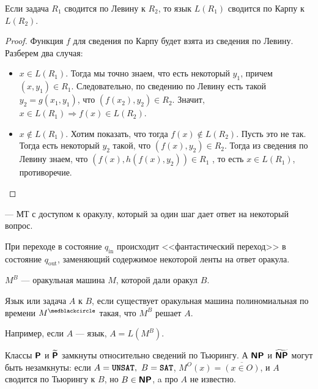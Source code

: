 		\begin{st}
	    Если задача $ R_1$ сводится по Левину к $ R_2$, то язык $ L(R_1)$ сводится по Карпу к $ L(R_2)$.
        \end{st}
        \begin{proof}
	    Функция $ f$ для сведения по Карпу будет взята из сведения по Левину. Разберем два случая:
	    \begin{itemize}
		    \item $ x \in L(R_1)$. Тогда мы точно знаем, что есть некоторый $ y_1$, причем $ (x, y_1) \in  R_1$. 
			    Следовательно, по сведению по Левину есть такой $ y_2 = g(x_1, y_1)$, что $ (f(x_2), y_2) \in R_2$. 
			    Значит, $x \in L(R_1) \Longrightarrow  f(x) \in L(R_2)$.
	        \item $x \notin L(R_1)$. Хотим показать, что тогда $ f(x) \notin L(R_2)$. Пусть это не так.
	            Тогда есть некоторый $ y_2$ такой, что $ (f(x), y_2) \in R_2$. 
	            Тогда из сведения по Левину знаем, что $(f(x), h(f(x), y_2)) \in  R_1$ , то есть $x \in  L(R_1)$, противоречие.
	    \end{itemize}
\end{proof}

\begin{defn}[Оракульная МТ]
	 --- МТ с доступом к оракулу, который за один шаг дает ответ на некоторый вопрос.
\end{defn}
\begin{name}
	При переходе в состояние $ q_{\text{in}}$ происходит <<фантастический переход>> в состояние $ q_{\text{out}}$, заменяющий содержимое некоторой ленты на ответ оракула.

	\noindent$ M^{B}$ --- оракульная машина $ M$, которой дали оракул $ B$. 
\end{name}

\begin{defn}
	Язык или задача $ A$  к $ B$, если существует оракульная машина полиномиальная по времени $ M^{\medblackcircle}$ такая, что $ M^{B}$ решает $ A$.

	\noindent
	Например, если  $ A$ ---  язык, $ A = L(M^{B})$.
\end{defn}
\begin{ex}
	Классы $\P$ и $\tP$ замкнуты относительно сведений по Тьюрингу. А $\NP$ и $\tNP$ могут быть незамкнуты: если $A = \UNSAT,~ B = \SAT$, $ M^{O}(x) = \overline{(x \in O)}$, и $ A$ сводится по Тьюрингу к $ B$, но $ B \in \NP$, a про $ A$ не известно.
\end{ex}

